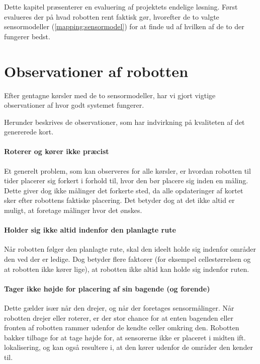 Dette kapitel præsenterer en evaluering af projektets endelige løsning.
Først evalueres der på hvad robotten rent faktisk gør, hvorefter de to valgte sensormodeller (\cref{mapping:sensormodel}) for at finde ud af hvilken af de to der fungerer bedst.

\section{Observationer af robotten}
Efter gentagne kørsler med de to sensormodeller, har vi gjort vigtige observationer af hvor godt systemet fungerer.

Herunder beskrives de observationer, som har indvirkning på kvaliteten af det genererede kort.

\paragraph{Roterer og kører ikke præcist}
Et generelt problem, som kan observeres for alle kørsler, er hvordan robotten til tider placerer sig forkert i forhold til, hvor den bør placere sig inden en måling.
Dette giver dog ikke målinger det forkerte sted, da alle opdateringer af kortet sker efter robottens faktiske placering. 
Det betyder dog at det ikke altid er muligt, at foretage målinger hvor det ønskes.

\paragraph{Holder sig ikke altid indenfor den planlagte rute}
Når robotten følger den planlagte rute, skal den ideelt holde sig indenfor områder den ved der er ledige.
Dog betyder flere faktorer (for eksempel cellestørrelsen og at robotten ikke kører lige), at robotten ikke altid kan holde sig indenfor ruten.

\paragraph{Tager ikke højde for placering af sin bagende (og forende)}
Dette gælder især når den drejer, og når der foretages sensormålinger.
Når robotten drejer eller roterer, er der stor chance for at enten bagenden eller fronten af robotten rammer udenfor de kendte celler omkring den.
Robotten bakker tilbage for at tage højde for, at sensorerne ikke er placeret i midten ift. lokalisering, og kan også resultere i, at den kører udenfor de områder den kender til.

